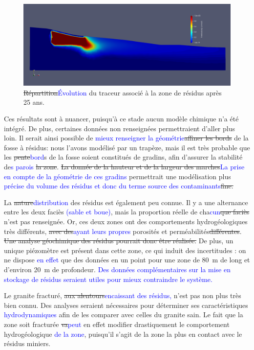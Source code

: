 \documentclass{article}
\newcommand{\blue}[1]{\textcolor{blue}{#1}} %
\begin{document}
\begin{figure}[H]
    \centering
    \includegraphics[width=0.9\linewidth]{III_B_3_8.png}
    \caption{\sout{Répartition}\blue{Évolution} du traceur associé à la zone de résidus après 25 ans.}
    \label{hytec_hydro_25ans}
\end{figure}

Ces résultats sont à nuancer, puisqu’à ce stade aucun modèle chimique n’a été intégré. De plus, certaines données non renseignées permettraient d’aller plus loin. Il serait ainsi possible de \blue{mieux renseigner la géométrie}\sout{affiner les bords} de la fosse à résidus: nous l’avons modélisé par un trapèze, mais il est très probable que les \sout{pente}\blue{bord}s de la fosse soient constitués de gradins, afin d’assurer la stabilité de\blue{s parois} \sout{la zone}. \sout{ La donnée de la hauteur et de la largeur des marches}\blue{La prise en compte de la géométrie de ces gradins} permettrait une modélisation plus \blue{précise du volume des résidus et donc du terme source des contaminants}\sout{fine.}

La \sout{nature}\blue{distribution} des résidus est également peu connue. Il y a une alternance entre les deux faciès \blue{(sable et boue)}, mais la proportion réelle de cha\blue{cun}\sout{que faciès} n’est pas renseignée. Or, ces deux zones ont des comportements hydrogéologiques très différents, \sout{avec des}\blue{ayant leurs propres} porosités et perméabilités\sout{différentes}. \sout{Une analyse géochimique des résidus pourrait donc être réalisée.} De plus, un unique piézomètre est présent dans cette zone, ce qui induit des incertitudes : on ne dispose \blue{en effet} que des données en un point pour une zone de 80~m de long et d’environ 20~m de profondeur. \blue{Des données complémentaires sur la mise en stockage de résidus seraient utiles pour mieux contraindre le système.}

Le granite fracturé, \sout{aux alentours}\blue{encaissant des résidus,} n’est pas non plus très bien connu. Des analyses seraient nécessaires pour déterminer ses caractéristiques \blue{hydrodynamiques} afin de les comparer avec celles du granite sain. Le fait que la zone soit fracturée \sout{va}\blue{peut} en effet modifier drastiquement le comportement hydrogéologique \blue{de la zone}, puisqu’il s’agit de la zone la plus en contact avec le résidus miniers.
\end{document}
